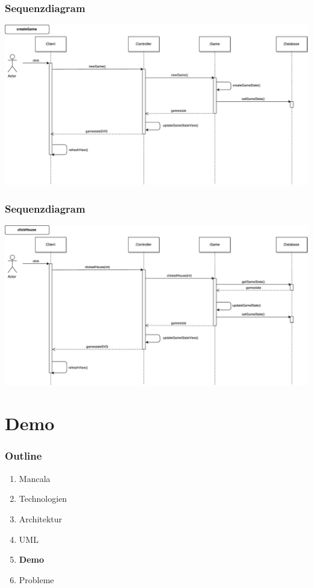 \documentclass[
	10pt,
	t		%
]{beamer}
\begin{document}
\begin{frame}
\frametitle{Sequenzdiagram}
\begin{center}
\includegraphics[scale=0.32]{./../Diagrams/Sequence_createGame.pdf}
\end{center}
\end{frame}

\begin{frame}
\frametitle{Sequenzdiagram}
\begin{center}
\includegraphics[scale=0.32]{./../Diagrams/Sequence_clickHouse.pdf}
\end{center}
\end{frame}

\section{Demo}
\begin{frame}
\frametitle{Outline}
\begin{enumerate}
\item Mancala
\item Technologien
\item Architektur
\item UML
\item \textbf{Demo}
\item Probleme
\end{enumerate}
\end{frame}
\end{document}
